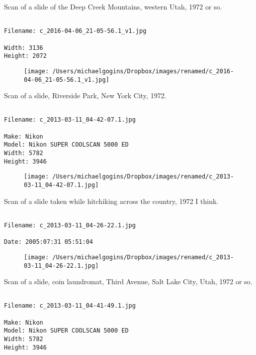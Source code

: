 \clearpage
\onecolumn
\noindent Scan of a slide of the Deep Creek Mountains, western Utah, 1972 or so.
\noindent
\begin{lstlisting}

Filename: c_2016-04-06_21-05-56.1_v1.jpg

Width: 3136
Height: 2072
\end{lstlisting}
\clearpage

\begin{figure}
\texttt{[image: /Users/michaelgogins/Dropbox/images/renamed/c\_2016-04-06\_21-05-56.1\_v1.jpg]}
\end{figure}
    
\clearpage
\onecolumn
\noindent Scan of a slide, Riverside Park, New York City, 1972.
\noindent
\begin{lstlisting}

Filename: c_2013-03-11_04-42-07.1.jpg

Make: Nikon
Model: Nikon SUPER COOLSCAN 5000 ED
Width: 5782
Height: 3946
\end{lstlisting}
\clearpage

\begin{figure}
\texttt{[image: /Users/michaelgogins/Dropbox/images/renamed/c\_2013-03-11\_04-42-07.1.jpg]}
\end{figure}
    
\clearpage
\onecolumn
\noindent Scan of a slide taken while hitchiking across the country, 1972 I think.
\noindent
\begin{lstlisting}

Filename: c_2013-03-11_04-26-22.1.jpg

Date: 2005:07:31 05:51:04
\end{lstlisting}
\clearpage

\begin{figure}
\texttt{[image: /Users/michaelgogins/Dropbox/images/renamed/c\_2013-03-11\_04-26-22.1.jpg]}
\end{figure}
    
\clearpage
\onecolumn
\noindent Scan of a slide, coin laundromat, Third Avenue, Salt Lake City, Utah, 1972 or so.
\noindent
\begin{lstlisting}

Filename: c_2013-03-11_04-41-49.1.jpg

Make: Nikon
Model: Nikon SUPER COOLSCAN 5000 ED
Width: 5782
Height: 3946
\end{lstlisting}
\clearpage

